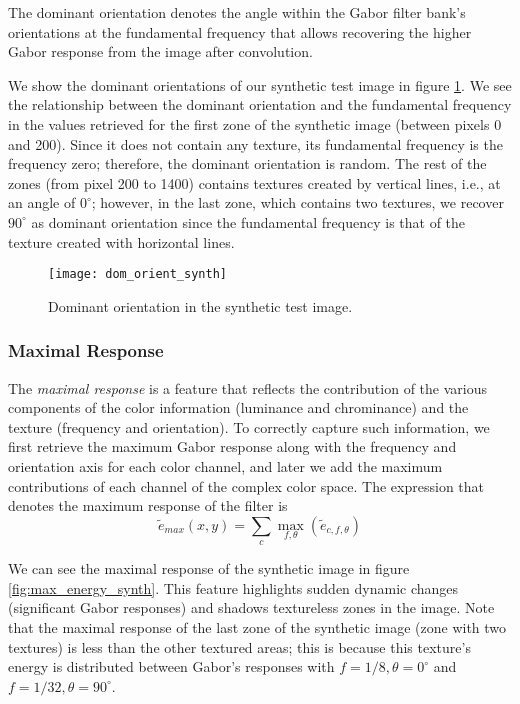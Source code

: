 The dominant orientation denotes the angle within the Gabor filter bank's orientations at the fundamental frequency that allows recovering the higher Gabor response from the image after convolution.

We show the dominant orientations of our synthetic test image in figure \ref{fig:dom_orient_synth}. We see the relationship between the dominant orientation and the fundamental frequency in the values retrieved for the first zone of the synthetic image (between pixels 0 and 200). Since it does not contain any texture, its fundamental frequency is the frequency zero; therefore, the dominant orientation is random. The rest of the zones (from pixel 200 to 1400) contains textures created by vertical lines, i.e., at an angle of $0^\circ$; however, in the last zone, which contains two textures, we recover $90^\circ$ as dominant orientation since the fundamental frequency is that of the texture created with horizontal lines. 

\begin{figure}[!ht]
	\texttt{[image: dom\_orient\_synth]}
    \caption{Dominant orientation in the synthetic test image.}
    \label{fig:dom_orient_synth}
\end{figure}

\subsubsection{Maximal Response}
The \textit{maximal response} is a feature that reflects the contribution of the various components of the color information (luminance and chrominance) and the texture (frequency and orientation). To correctly capture such information, we first retrieve the maximum Gabor response along with the frequency and orientation axis for each color channel, and later we add the maximum contributions of each channel of the complex color space. The expression that denotes the maximum response of the filter is
\begin{equation}
	\widetilde{e}_{max}(x,y) = \underset{c}{\sum} \underset{f, \theta}{\max} (\widetilde{e}_{c, f, \theta}) \label{eq:max_energy}
\end{equation}

We can see the maximal response of the synthetic image in figure \ref{fig:max_energy_synth}. This feature highlights sudden dynamic changes (significant Gabor responses) and shadows textureless zones in the image. Note that the maximal response of the last zone of the synthetic image (zone with two textures) is less than the other textured areas; this is because this texture's energy is distributed between Gabor's responses with $f=1/8, \theta=0^\circ$ and $f=1/32, \theta=90^\circ$.

